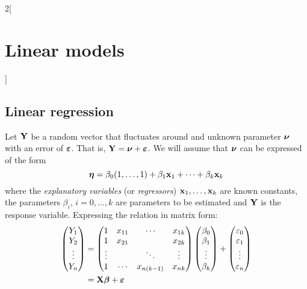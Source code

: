 \documentclass[../../../main.tex]{subfiles}
\begin{document}
\renewcommand{\col}{\sta}
\begin{multicols}{2}[\section{Linear models}]
  \subsection{Linear regression}
  \begin{definition}
    Let $\boldsymbol{\mathrm{Y}}$ be a random vector that fluctuates around and unknown parameter $\boldsymbol{\mathrm{\nu}}$ with an error of $\boldsymbol{\mathrm{\varepsilon}}$. That is, $\boldsymbol{\mathrm{Y}}=\boldsymbol{\mathrm{\nu}}+\boldsymbol{\mathrm{\varepsilon}}$. We will assume that $\boldsymbol{\mathrm{\nu}}$ can be expressed of the form $$\boldsymbol{\mathrm{\eta}}=\beta_0(1,\ldots,1)+\beta_1\boldsymbol{\mathrm{x}}_1+\cdots+\beta_k\boldsymbol{\mathrm{x}}_k$$ where the \emph{explanatory variables} (or \emph{regressors}) $\boldsymbol{\mathrm{x}}_1,\ldots,\boldsymbol{\mathrm{x}}_k$ are known constants, the parameters $\beta_i$, $i=0,\ldots,k$ are parameters to be estimated and $\boldsymbol{\mathrm{Y}}$ is the response variable. Expressing the relation in matrix form:
    \begin{align*}
      \begin{pmatrix}
        Y_1    \\
        Y_2    \\
        \vdots \\
        Y_n
      \end{pmatrix} & =
      \begin{pmatrix}
        1      & x_{11} & \cdots     & x_{1k} \\
        1      & x_{21} &            & x_{2k} \\
        \vdots &        & \ddots     & \vdots \\
        1      & \cdots & x_{n(k-1)} & x_{nk}
      \end{pmatrix}\begin{pmatrix}
                     \beta_0 \\
                     \beta_1 \\
                     \vdots  \\
                     \beta_k \\
                   \end{pmatrix}+
      \begin{pmatrix}
        \varepsilon_0 \\
        \varepsilon_1 \\
        \vdots        \\
        \varepsilon_n \\
      \end{pmatrix}                                       \\
                      & =\boldsymbol{\mathrm{X}}\boldsymbol{\mathrm{\beta}}+\boldsymbol{\mathrm{\varepsilon}}
    \end{align*}
  \end{definition}
\end{multicols}
\end{document}
